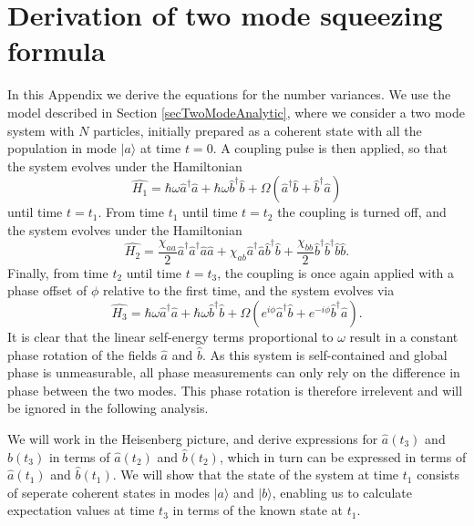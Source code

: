 \documentclass{iopart}
\begin{document}
\section{Derivation of two mode squeezing formula}
\label{appendixTwoModeDerivation}
In this Appendix we derive the equations for the number variances. We use the model described in Section \ref{secTwoModeAnalytic}, where we consider a two mode system with $N$ particles, initially prepared as a coherent state with all the population in mode $|a\rangle$ at time $t=0$. A coupling pulse is then applied, so that the system evolves under the Hamiltonian
\begin{equation}
\hat{H_1} = \hbar \omega \hat{a}^{\dagger} \hat{a} +  \hbar \omega \hat{b}^{\dagger} \hat{b} 
          + \Omega (\hat{a}^{\dagger} \hat{b} + \hat{b}^{\dagger} \hat{a} )
\end{equation}
until time $t=t_1$. From time $t_1$ until time $t=t_2$ the coupling is turned off, and the system evolves under the Hamiltonian
\begin{equation}
\hat{H_2} = \frac{\chi_{aa}}{2} \hat{a}^{\dagger} \hat{a}^{\dagger} \hat{a} \hat{a}
          + \chi_{ab} \hat{a}^{\dagger} \hat{a} \hat{b}^{\dagger} \hat{b}
          + \frac{\chi_{bb}}{2} \hat{b}^{\dagger} \hat{b}^{\dagger} \hat{b} \hat{b}.
\end{equation}
Finally, from time $t_2$ until time $t=t_3$, the coupling is once again applied with a phase offset of $\phi$ relative to the first time, and the system evolves via
\begin{equation}
\hat{H_3} = \hbar \omega \hat{a}^{\dagger} \hat{a} +  \hbar \omega \hat{b}^{\dagger} \hat{b}
          + \Omega (e^{i\phi} \hat{a}^{\dagger} \hat{b} + e^{-i\phi} \hat{b}^{\dagger} \hat{a} ).
\end{equation}
It is clear that the linear self-energy terms proportional to $\omega$ result in a constant phase rotation of the fields $\hat{a}$ and $\hat{b}$. As this system is self-contained and global phase is unmeasurable, all phase measurements can only rely on the difference in phase between the two modes. This phase rotation is therefore irrelevent and will be ignored in the following analysis.

We will work in the Heisenberg picture, and derive expressions for $\hat{a}(t_3)$ and $\hat{b}(t_3)$ in terms of $\hat{a}(t_2)$ and $\hat{b}(t_2)$, which in turn can be expressed in terms of $\hat{a}(t_1)$ and $\hat{b}(t_1)$. We will show that the state of the system at time $t_1$ consists of seperate coherent states in modes $|a\rangle$ and $|b\rangle$, enabling us to calculate expectation values at time $t_3$ in terms of the known state at $t_1$.
\end{document}
